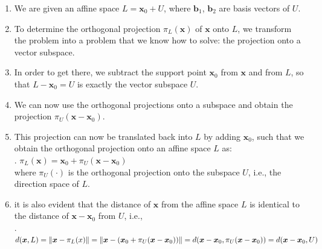 \begin{enumerate}
    \item We are given an affine space $L = \bm{x}_0 + U$, where $\bm{b}_1$, $\bm{b}_2$ are basis vectors of $U$.
    \hfill \cite{mfml/book/mml/Deisenroth-Faisal-Ong}

    \item To determine the orthogonal projection $\pi_L(\bm{x})$ of $\bm{x}$ onto $L$, we transform the problem into a problem that we know how to solve: the projection onto a vector subspace.
    \hfill \cite{mfml/book/mml/Deisenroth-Faisal-Ong}

    \item  In order to get there, we subtract the support point $\bm{x}_0$ from $\bm{x}$ and from $L$, so that $L - \bm{x}_0 = U$ is exactly the vector subspace $U$. 
    \hfill \cite{mfml/book/mml/Deisenroth-Faisal-Ong}
    
    \item We can now use the orthogonal projections onto a subspace and obtain the projection $\pi_U (\bm{x} - \bm{x}_0)$.
    \hfill \cite{mfml/book/mml/Deisenroth-Faisal-Ong}

    \item This projection can now be translated back into $L$ by adding $\bm{x}_0$, such that we obtain the orthogonal projection onto an affine space $L$ as:
    \hfill \cite{mfml/book/mml/Deisenroth-Faisal-Ong}
    \\
    .\hfill
    $
        \pi_L(\bm{x}) = \bm{x}_0 + \pi_U (\bm{x} - \bm{x}_0)
    $
    \hfill \cite{mfml/book/mml/Deisenroth-Faisal-Ong}
    \\
    where $\pi_U (\cdot)$ is the orthogonal projection onto the subspace $U$, i.e., the direction space of $L$.
    \hfill \cite{mfml/book/mml/Deisenroth-Faisal-Ong}

    \item it is also evident that the distance of $\bm{x}$ from the affine space $L$ is identical to the distance of $\bm{x} - \bm{x}_0$ from $U$, i.e.,
    \hfill \cite{mfml/book/mml/Deisenroth-Faisal-Ong}
    \\
    .\hfill
    $
        d(\bm{x}, L) 
        = \left\| \bm{x} - \pi_L(x) \right\| 
        = \left\| \bm{x} - (\bm{x}_0 + \pi_U (\bm{x} - \bm{x}_0)) \right\|
        = d(\bm{x} - \bm{x}_0, \pi_U (\bm{x} - \bm{x}_0)) 
        = d(\bm{x} - \bm{x}_0, U)
    $
    \hfill \cite{mfml/book/mml/Deisenroth-Faisal-Ong}
\end{enumerate}





